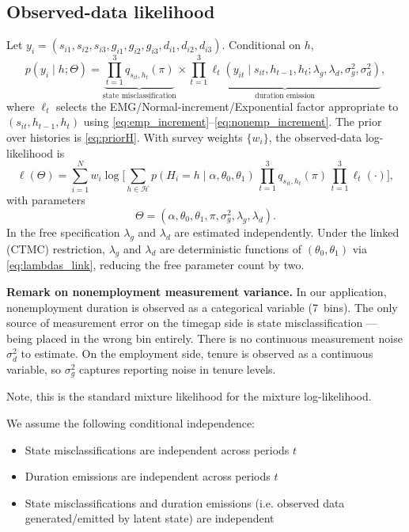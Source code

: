 \documentclass[12pt]{article}
\begin{document}
\subsection{Observed-data likelihood}
Let \(y_i=(s_{i1},s_{i2},s_{i3},g_{i1},g_{i2},g_{i3},d_{i1},d_{i2},d_{i3})\). Conditional on \(h\),
\[
p(y_i\mid h;\Theta)=\underbrace{\prod_{t=1}^3 q_{s_{it},h_t}(\pi)}_{\text{state misclassification}}\times
\underbrace{\prod_{t=1}^3 \ell_t(y_{it}\mid s_{it},h_{t-1},h_t;\lambda_g,\lambda_d,\sigma_g^2,\sigma_d^2)}_{\text{duration emission}},
\]
where \(\ell_t\) selects the EMG/Normal-increment/Exponential factor appropriate to \((s_{it},h_{t-1},h_t)\) using \eqref{eq:emp_increment}–\eqref{eq:nonemp_increment}. The prior over histories is \eqref{eq:priorH}. With survey weights \(\{w_i\}\), the observed-data log-likelihood is
\begin{equation}
\ell(\Theta)=\sum_{i=1}^N w_i\log\bigg[\sum_{h\in\mathcal{H}} p(H_i=h\mid\alpha,\theta_0,\theta_1)\,
\prod_{t=1}^3 q_{s_{it},h_t}(\pi)\,
\prod_{t=1}^3 \ell_t(\cdot)\bigg],
\label{eq:obs_ll}
\end{equation}
with parameters
\[
\Theta=(\alpha,\theta_0,\theta_1,\pi,\sigma_g^2,\lambda_g,\lambda_d).
\]
In the free specification \(\lambda_g\) and \(\lambda_d\) are estimated independently. Under the linked (CTMC) restriction, \(\lambda_g\) and \(\lambda_d\) are deterministic functions of \((\theta_0,\theta_1)\) via \eqref{eq:lambdas_link}, reducing the free parameter count by two.

\textbf{Remark on nonemployment measurement variance.} In our application, nonemployment duration is observed as a categorical variable (7~bins). The only source of measurement error on the timegap side is state misclassification --- being placed in the wrong bin entirely. There is no continuous measurement noise \(\sigma_d^2\) to estimate. On the employment side, tenure is observed as a continuous variable, so \(\sigma_g^2\) captures reporting noise in tenure levels.

Note, this is the standard mixture likelihood for the mixture log-likelihood. 

We assume the following conditional independence:

\begin{itemize}
    \item State misclassifications are independent across periods $t$ \\
    \item Duration emissions are independent across periods $t$ \\
    \item State misclassifications and duration emissions (i.e. observed data generated/emitted by latent state) are independent
\end{itemize}
\end{document}
